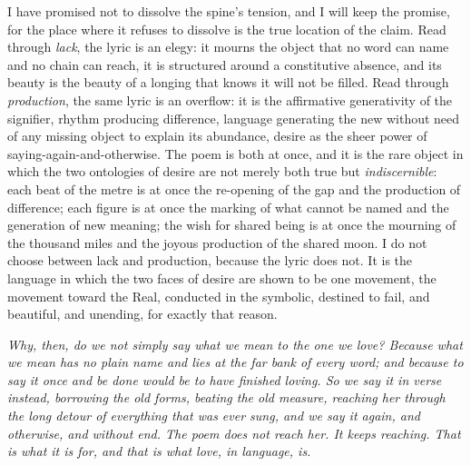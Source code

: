 I have promised not to dissolve the spine's tension, and I will keep the promise, for the place where it refuses to dissolve is the true location of the claim. Read through \emph{lack}, the lyric is an elegy: it mourns the object that no word can name and no chain can reach, it is structured around a constitutive absence, and its beauty is the beauty of a longing that knows it will not be filled. Read through \emph{production}, the same lyric is an overflow: it is the affirmative generativity of the signifier, rhythm producing difference, language generating the new without need of any missing object to explain its abundance, desire as the sheer power of saying-again-and-otherwise. The poem is both at once, and it is the rare object in which the two ontologies of desire are not merely both true but \emph{indiscernible}: each beat of the metre is at once the re-opening of the gap and the production of difference; each figure is at once the marking of what cannot be named and the generation of new meaning; the wish for shared being is at once the mourning of the thousand miles and the joyous production of the shared moon. I do not choose between lack and production, because the lyric does not. It is the language in which the two faces of desire are shown to be one movement, the movement toward the Real, conducted in the symbolic, destined to fail, and beautiful, and unending, for exactly that reason.

\medskip
{\color{warnred}\itshape Why, then, do we not simply say what we mean to the one we love? Because what we mean has no plain name and lies at the far bank of every word; and because to say it once and be done would be to have finished loving. So we say it in verse instead, borrowing the old forms, beating the old measure, reaching her through the long detour of everything that was ever sung, and we say it again, and otherwise, and without end. The poem does not reach her. It keeps reaching. That is what it is for, and that is what love, in language, is.}
